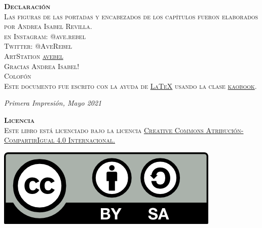 \documentclass[
	fontsize=12pt, %
	twoside=false, %
	numbers=noenddot, %
]{kaobook}
\begin{document}
\noindent \textsc{\textbf{Declaraci\'on}\\
	Las figuras de las portadas y  encabezados de los cap\'itulos fueron elaborados por Andrea Isabel Revilla. \\ {en Instagram:  @ave.rebel \\ Twitter: @AveRebel \\ ArtStation \href{https://linktr.ee/avebel}{avebel} }  \\ Gracias Andrea Isabel!}\\ 

\noindent \textsc{ {Colof\'on} \\
	Este documento fue escrito con la ayuda de \href{https://sourceforge.net/projects/koma-script/}{\KOMAScript}  \href{https://www.latex-project.org/}{\LaTeX} usando la clase \href{https://github.com/fmarotta/kaobook/}{kaobook}.}

\noindent \textit{Primera Impresi\'on, Mayo 2021} %

\noindent \textsc{ \textbf{Licencia} \\
 Este libro está licenciado bajo la licencia \href{http://creativecommons.org/licenses/by-sa/4.0/}{Creative Commons Atribución-CompartirIgual 4.0 Internacional.} 
} 

											

\includegraphics[width=0.4\linewidth]{by-sa.png}


\makeatletter
\uppertitleback{\@titlehead} %




\newpage
\vspace*{\fill}

 	
\end{document}
